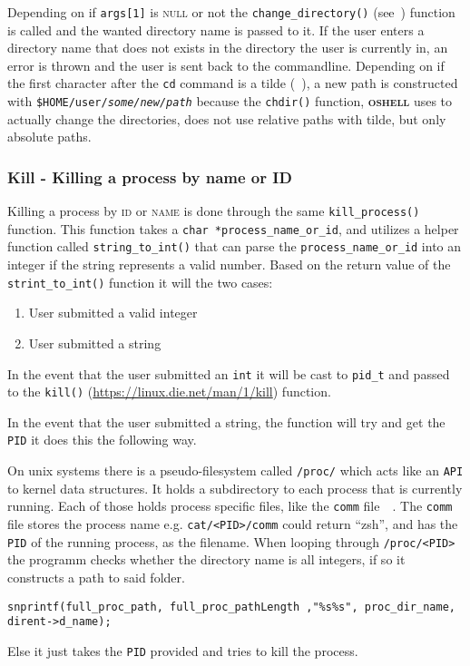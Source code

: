 \documentclass[12pt,english]{article}
\newcommand{\funcname}[1]{\texttt{#1()}\xspace} %
\newcommand{\projectname}{\textsc{oshell}}
\begin{document}
 Depending on if \texttt{args[1]} is \textsc{null} or not the  
\funcname{change\_directory}
(see~) function is called
and the wanted directory name is passed to it. If the user
enters a directory name that does not exists in the directory the user is currently in, an error is thrown and the user is
sent back to the commandline. Depending on
if the first character after the \texttt{cd} command is a
tilde (\texttt{\string~}), a new path is constructed
with \texttt{\$HOME/user/\emph{some/new/path}} because the \funcname{chdir}
function, \textbf{\projectname} uses to actually change
the directories,
does not use relative paths with tilde, but only
absolute paths.

\subsubsection{Kill - Killing a process by name or ID}
Killing a process by \textsc{id} or \textsc{name} is done
through the same \funcname{kill\_process} function.
This function takes a \texttt{char *process\_name\_or\_id},
and utilizes a helper function called
\funcname{string\_to\_int}
that can parse the \texttt{process\_name\_or\_id}
into an integer if the string represents a valid number.
Based on the return value of the \funcname{strint\_to\_int}
function it will the two cases:
\begin{enumerate}
\item User submitted a valid integer
 \item User submitted a string
 \end{enumerate}

 In the event that the user submitted an \texttt{int} 
 it will be cast to \texttt{pid\_t}
 and passed to the \funcname{kill}
 (\url{https://linux.die.net/man/1/kill}) function.

 In the event that the user submitted a string, the function will
 try and get the \texttt{PID} it does this the following way.

 On unix systems there is a pseudo-filesystem called
 \texttt{/proc/} which acts like an \texttt{API} to kernel data structures.
 It holds a subdirectory to each process that is currently running.
 Each of those holds process specific files, like the
 \texttt{comm}
file~\cite{Proc5LinuxManual}~\cite{ProcPseudoFile}.
The \texttt{comm} file stores the process name e.g.
\texttt{cat/<PID>/comm} could return ``zsh'',
 and has the \texttt{PID} of the running process, as the
 filename.
 When looping through \texttt{/proc/<PID>} the programm
 checks whether the directory name is all integers, if so
 it constructs a path to said folder.
\begin{verbatim}
snprintf(full_proc_path, full_proc_pathLength ,"%s%s", proc_dir_name, dirent->d_name);
\end{verbatim}
 Else it just takes the \texttt{PID} provided and tries
 to kill the process.
 
\end{document}
